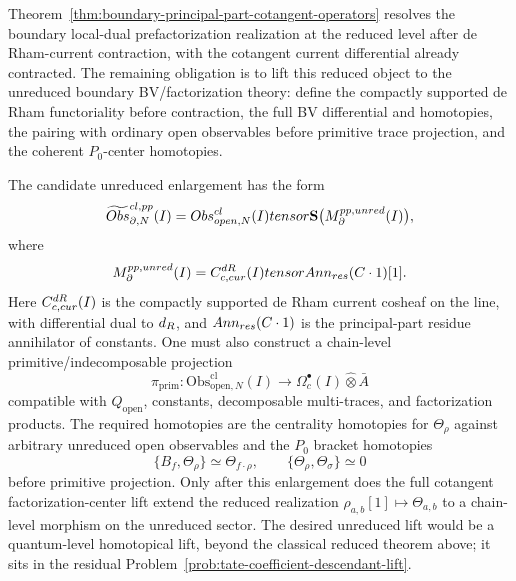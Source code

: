 \documentclass[11pt]{memoir}
\begin{document}
\begin{rmk}\label{rmk:unreduced-lift-status}
  Theorem~\ref{thm:boundary-principal-part-cotangent-operators} resolves
  the boundary local-dual prefactorization realization at the reduced
  level after de Rham-current contraction, with the cotangent current
  differential already contracted. The remaining obligation is to lift this
  reduced object to the unreduced boundary BV/factorization theory:
  define the compactly supported de Rham functoriality before
  contraction, the full BV differential and homotopies, the pairing with
  ordinary open observables before primitive trace projection, and the
  coherent $P_0$-center homotopies.

  The candidate unreduced enlargement has the form
  $$\widetilde{Obs}^{cl,pp}_{\partial,N}(I)
    =
    Obs^{cl}_{open,N}(I)
    tensor
    \mathbf S\bigl(M^{pp,unred}_\partial(I)\bigr),$$
  where
  $$M^{pp,unred}_\partial(I)
    =
    C^{dR}_{c,cur}(I)
    tensor
    Ann_{res}(C\cdot1)[1].$$
  Here $C^{dR}_{c,cur}(I)$ is the compactly
  supported de Rham current cosheaf on the line, with differential dual
  to $d_{R}$, and $Ann_{res}(C\cdot1)$ is the
  principal-part residue annihilator of constants. One must also construct a chain-level
  primitive/indecomposable projection
  $$\pi_{\mathrm{prim}}:
    \mathrm{Obs}^{\mathrm{cl}}_{\mathrm{open},N}(I)
    \longrightarrow
    \Omega_c^\bullet(I)\widehat\otimes\bar A$$
  compatible with $Q_{\mathrm{open}}$, constants, decomposable
  multi-traces, and factorization products. The required homotopies
  are the centrality homotopies for $\Theta_\rho$ against arbitrary
  unreduced open observables and the $P_0$ bracket homotopies
  $$\{B_f,\Theta_\rho\}\simeq\Theta_{f\cdot\rho},\qquad
    \{\Theta_\rho,\Theta_\sigma\}\simeq0$$
  before primitive projection. Only after this enlargement does the
  full cotangent factorization-center lift extend the reduced
  realization $\rho_{a,b}[1]\mapsto\Theta_{a,b}$ to a chain-level
  morphism on the unreduced sector. The desired unreduced lift would be a
  quantum-level homotopical lift, beyond the classical reduced theorem
  above; it sits in the residual
  Problem~\ref{prob:tate-coefficient-descendant-lift}.
\end{rmk}
\end{document}
